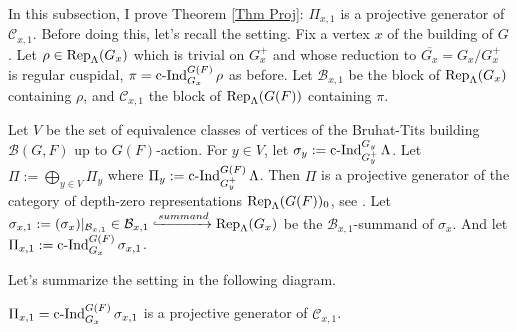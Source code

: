 	In this subsection, I prove Theorem \ref{Thm Proj}: $\Pi_{x,1}$ is a projective generator of $\mathcal{C}_{x,1}$. Before doing this, let's recall the setting. Fix a vertex $x$ of the building of $G$. Let $\rho \in \operatorname{\operatorname{Rep}}_{\Lambda}(G_x)$ which is trivial on $G_x^+$ and whose reduction to $\overline{G_x}=G_x/G_x^+$ is regular cuspidal, $\pi=\operatorname{\operatorname{c-Ind}}_{G_x}^{G(F)}\rho$ as before. Let $\mathcal{B}_{x,1}$ be the block of $\operatorname{\operatorname{Rep}}_{\Lambda}(G_x)$ containing $\rho$, and $\mathcal{C}_{x,1}$ the block of $\operatorname{\operatorname{Rep}}_{\Lambda}(G(F))$ containing $\pi$. 
	
	Let $V$ be the set of equivalence classes of vertices of the Bruhat-Tits building $\mathcal{B}(G, F)$ up to $G(F)$-action. For $y \in V$, let $\sigma_y:=\operatorname{\operatorname{c-Ind}}_{G_y^+}^{G_y}\Lambda$. Let $\Pi:=\bigoplus_{y \in V}\Pi_y$ where $\Pi_y:=\operatorname{\operatorname{c-Ind}}_{G_y^+}^{G(F)}\Lambda$. Then $\Pi$ is a projective generator of the category of depth-zero representations $\operatorname{\operatorname{Rep}}_{\Lambda}(G(F))_0$, see \cite[Appendix]{dat2009finitude}. Let $\sigma_{x,1}:=(\sigma_x)|_{\mathcal{B}_{x,1}} \in \mathcal{B}_{x,1} \xhookrightarrow{summand} \operatorname{\operatorname{Rep}}_{\Lambda}(G_x)$ be the $\mathcal{B}_{x,1}$-summand of $\sigma_x$. And let $\Pi_{x,1}:=\operatorname{\operatorname{c-Ind}}_{G_x}^{G(F)}\sigma_{x,1}$.
	
	Let's summarize the setting in the following diagram.
	
	
	\begin{theorem}
		$\Pi_{x,1}=\operatorname{\operatorname{c-Ind}}_{G_x}^{G(F)}\sigma_{x,1}$ is a projective generator of $\mathcal{C}_{x,1}$.
	\end{theorem}
	
